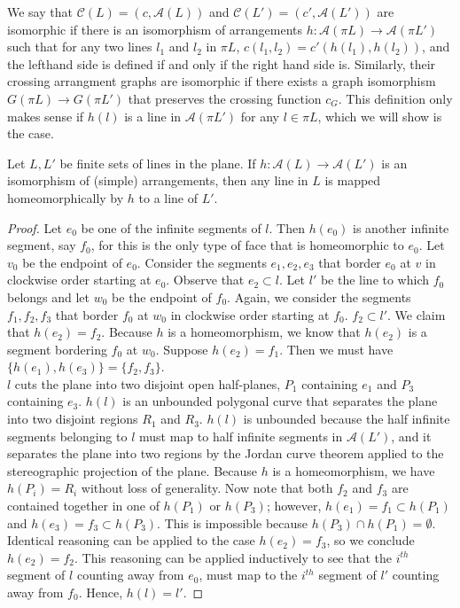 \documentclass[11pt, oneside]{article}
\begin{document}
We say that $\mathcal{C}(L) = (c, \mathcal{A}(L))$ and $\mathcal{C}(L')  = (c', \mathcal{A}(L'))$ are isomorphic if there is an isomorphism of arrangements $h:\mathcal{A }(\pi L) \to \mathcal{A} (\pi L')$ such that for any two lines $l_1$ and $l_2$ in $\pi L$, $c(l_1, l_2) = c'(h(l_1), h(l_2))$, and the lefthand side is defined if and only if the right hand side is. Similarly, their crossing arrangment graphs are isomorphic if there exists a graph isomorphism $G( \pi L) \to G( \pi L')$ that preserves the crossing function $c_G$. This definition only makes sense if $h(l)$ is a line in $\mathcal{A}(\pi L')$ for any $l \in \pi L$, which we will show is the case. 
 \begin{lem}
Let $L, L'$ be finite sets of lines in the plane. If $h: \mathcal{A}(L) \to \mathcal{A}(L')$ is an isomorphism of (simple) arrangements, then any line in $L$ is mapped homeomorphically by $h$ to a line of $L'$. 
 \end{lem}
\begin{proof}
Let $e_0$ be one of the infinite segments of $l$. Then $h(e_0)$ is another infinite segment, say $f_0$, for this is the only type of face that is homeomorphic to $e_0$. Let $v_0$ be the endpoint of $e_0$. Consider the segments $e_1, e_2, e_3$ that border $e_0$ at $v$ in clockwise order starting at $e_0$. Observe that $e_2 \subset l$. Let $l'$ be the line to which $f_0$ belongs and let $w_0$ be the endpoint of $f_0$. Again, we consider the segments $f_1, f_2, f_3$ that border $f_0$ at $w_0$ in clockwise order starting at $f_0$. $f_2 \subset l'$. We claim that $h(e_2) = f_2$. Because $h$ is a homeomorphism, we know that $h(e_2)$ is a segment bordering $f_0$ at $w_0$. Suppose $h(e_2) = f_1$. Then we must have $\{h(e_1),h(e_3)\} = \{f_2, f_3\}$. \\

 $l$ cuts the plane into two disjoint open half-planes, $P_1$ containing $e_1$ and $P_3$ containing $e_3$. $h(l)$ is an unbounded polygonal curve that separates the plane into two disjoint regions $R_1$ and $R_3$. $h(l)$ is unbounded because the half infinite segments belonging to $l$ must map to half infinite segments in $\mathcal{A}(L')$, and it separates the plane into two regions by the Jordan curve theorem applied to the stereographic projection of the plane. Because $h$ is a homeomorphism, we have $h(P_i) = R_i$ without loss of generality. Now note that both $f_2$ and $f_3$ are contained together in one of $h(P_1)$ or $h(P_3)$; however, $h(e_1) =f_1\subset h(P_1)$ and $h(e_3) = f_3 \subset h(P_3)$. This is impossible because $h(P_3) \cap h(P_1) = \emptyset$. \\
 
 Identical reasoning can be applied to the case $h(e_2) = f_3$, so we conclude $h(e_2) = f_2$. This reasoning can be applied inductively to see that the $i^{th}$ segment of $l$ counting away from $e_0$, must map to the $i^{th}$ segment of $l'$ counting away from $f_0$. Hence, $h(l) = l'$. 
 \end{proof}
 
\end{document}
